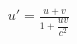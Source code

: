 \documentclass[preview]{standalone}
\begin{document}
\begin{align*}
u'  = \frac{ u  +  v }{1 + \dfrac{ u v }{ c^2 }}
\end{align*}
\end{document}
